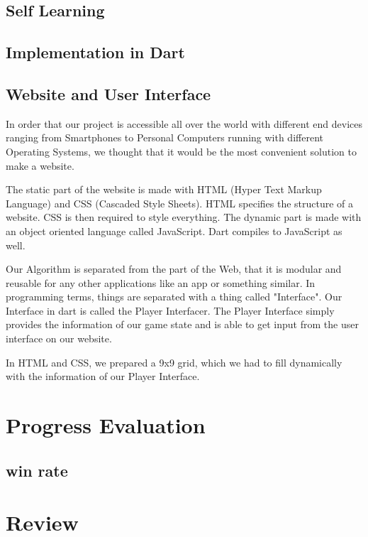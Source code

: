 \subsection{Self Learning}


\subsection{Implementation in Dart}



\subsection{Website and User Interface}
In order that our project is accessible all over the world with different end devices ranging from Smartphones to Personal Computers running with different Operating Systems, we thought that it would be the most convenient solution to make a website. 

The static part of the website is made with HTML (Hyper Text Markup Language) and CSS (Cascaded Style Sheets). HTML specifies the structure of a website.  CSS is then required to style everything. The dynamic part is made with an object oriented language called JavaScript. Dart compiles to JavaScript as well.

Our Algorithm is separated from the part of the Web, that it is modular and reusable for any other applications like an app or something similar. In programming terms, things are separated with a thing called "Interface". Our Interface in dart is called the Player Interfacer. The Player Interface simply provides the information of our game state and is able to get input from the user interface on our website.

In HTML and CSS, we prepared a 9x9 grid, which we had to fill dynamically with the information of our Player Interface. 

\section{Progress Evaluation}
\subsection{win rate}

\section{Review}